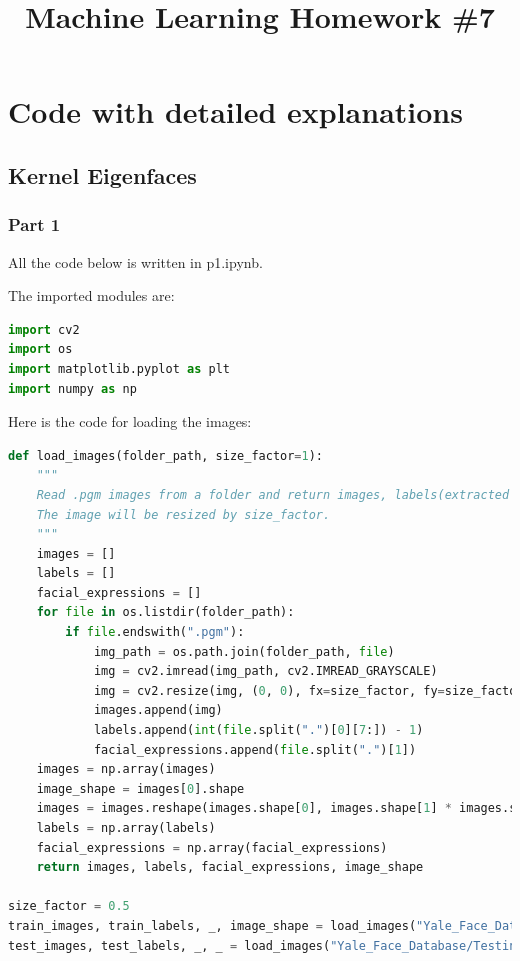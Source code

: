 \documentclass{homework}
\begin{document}
\title{Machine Learning Homework \#7}
\author{\chineseName \masterStudentID}
\date{}
\maketitle

\section{Code with detailed explanations}

\subsection{Kernel Eigenfaces}

\subsubsection{Part 1}

All the code below is written in p1.ipynb.

The imported modules are:

\begin{lstlisting}[language=Python]
import cv2
import os
import matplotlib.pyplot as plt
import numpy as np
\end{lstlisting}

Here is the code for loading the images:

\begin{lstlisting}[language=Python]
def load_images(folder_path, size_factor=1):
    """
    Read .pgm images from a folder and return images, labels(extracted from file names), facial expressions and image shape.
    The image will be resized by size_factor.
    """
    images = []
    labels = []
    facial_expressions = []
    for file in os.listdir(folder_path):
        if file.endswith(".pgm"):
            img_path = os.path.join(folder_path, file)
            img = cv2.imread(img_path, cv2.IMREAD_GRAYSCALE)
            img = cv2.resize(img, (0, 0), fx=size_factor, fy=size_factor)
            images.append(img)
            labels.append(int(file.split(".")[0][7:]) - 1)
            facial_expressions.append(file.split(".")[1])
    images = np.array(images)
    image_shape = images[0].shape
    images = images.reshape(images.shape[0], images.shape[1] * images.shape[2])
    labels = np.array(labels)
    facial_expressions = np.array(facial_expressions)
    return images, labels, facial_expressions, image_shape

size_factor = 0.5
train_images, train_labels, _, image_shape = load_images("Yale_Face_Database/Training", size_factor=size_factor)
test_images, test_labels, _, _ = load_images("Yale_Face_Database/Testing", size_factor=size_factor)
\end{lstlisting}
\end{document}
